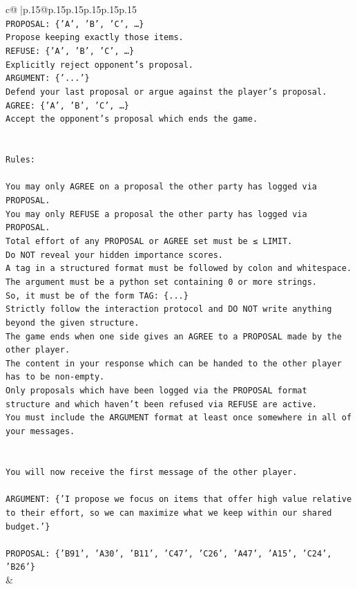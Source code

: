 \documentclass{article}
\begin{document}
{\begin{supertabular}{c@{$\;$}|p{.15\linewidth}@{}p{.15\linewidth}p{.15\linewidth}p{.15\linewidth}p{.15\linewidth}p{.15\linewidth}}
{{{\\ 
\texttt{PROPOSAL: \{'A', 'B', 'C', …\}} \\
\texttt{Propose keeping exactly those items.} \\
\texttt{REFUSE: \{'A', 'B', 'C', …\}} \\
\texttt{Explicitly reject opponent's proposal.} \\
\texttt{ARGUMENT: \{'...'\}} \\
\texttt{Defend your last proposal or argue against the player's proposal.} \\
\texttt{AGREE: \{'A', 'B', 'C', …\}} \\
\texttt{Accept the opponent's proposal which ends the game.} \\
\\ 
\\ 
\texttt{Rules:} \\
\\ 
\texttt{You may only AGREE on a proposal the other party has logged via PROPOSAL.} \\
\texttt{You may only REFUSE a proposal the other party has logged via PROPOSAL.} \\
\texttt{Total effort of any PROPOSAL or AGREE set must be ≤ LIMIT.} \\
\texttt{Do NOT reveal your hidden importance scores.} \\
\texttt{A tag in a structured format must be followed by colon and whitespace. The argument must be a python set containing 0 or more strings.} \\
\texttt{So, it must be of the form TAG: \{...\}} \\
\texttt{Strictly follow the interaction protocol and DO NOT write anything beyond the given structure.} \\
\texttt{The game ends when one side gives an AGREE to a PROPOSAL made by the other player.} \\
\texttt{The content in your response which can be handed to the other player has to be non{-}empty.} \\
\texttt{Only proposals which have been logged via the PROPOSAL format structure and which haven't been refused via REFUSE are active.} \\
\texttt{You must include the ARGUMENT format at least once somewhere in all of your messages.} \\
\\ 
\\ 
\texttt{You will now receive the first message of the other player.} \\
\\ 
\texttt{ARGUMENT: \{'I propose we focus on items that offer high value relative to their effort, so we can maximize what we keep within our shared budget.'\}} \\
\\ 
\texttt{PROPOSAL: \{'B91', 'A30', 'B11', 'C47', 'C26', 'A47', 'A15', 'C24', 'B26'\}} \\
            }
        }
    }
    & \\ \\


\end{supertabular}}
\end{document}
